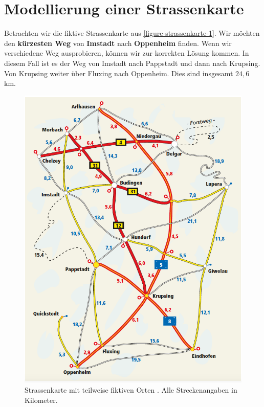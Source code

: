 
\routenplanerLernziele

\section{Modellierung einer Strassenkarte}

Betrachten wir die fiktive Strassenkarte aus \autoref{figure-strassenkarte-1}. Wir möchten den \textbf{kürzesten Weg} von \textbf{Imstadt} nach \textbf{Oppenheim} finden. Wenn wir verschiedene Weg ausprobieren, können wir zur korrekten Lösung kommen. In diesem Fall ist es der Weg von Imstadt nach Pappstadt und dann nach Krupsing. Von Krupsing weiter über Fluxing nach Oppenheim. Dies sind insgesamt $24,6$ km.

\begin{figure}[htb]
\centering
\includegraphics[scale=0.425]{strassenkarte_abenteuer_informatik}
\caption{Strassenkarte mit teilweise fiktiven Orten \cite{abenteuer-informatik}. Alle Streckenangaben in Kilometer.}
\label{figure-strassenkarte-1}
\end{figure}

